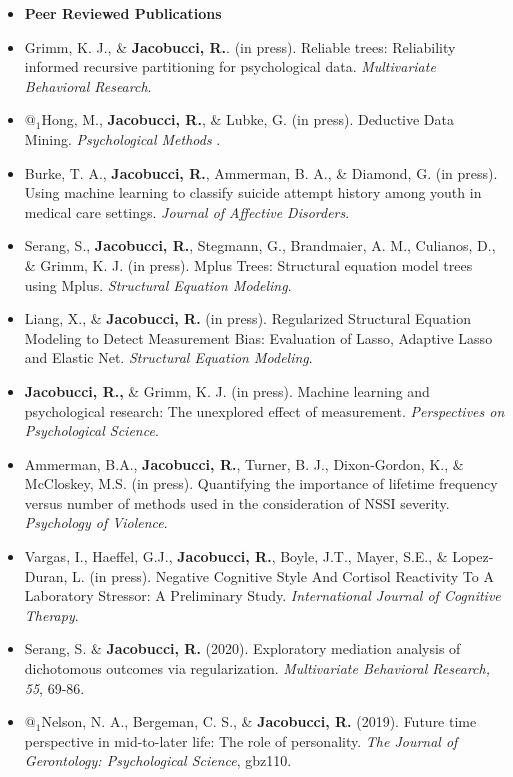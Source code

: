 \documentclass[letterpaper,10pt]{article}
\begin{document}
\begin{itemize} 
\setlength{\topsep}{0pt}%
\setlength{\leftmargin}{0.1in}%
\setlength{\listparindent}{-0.1in}%
\setlength{\itemindent}{-0.2in}%
\setlength{\parsep}{\parskip}%

\item {\textbf{\large{Peer Reviewed Publications}}}
% 
\item[] Grimm, K. J., \& \textbf{Jacobucci, R.}. (in press). Reliable trees: Reliability informed recursive partitioning for psychological data. \emph{Multivariate Behavioral Research}.
%
\item[] $@_1$Hong, M., \textbf{Jacobucci, R.}, \& Lubke, G. (in press). Deductive Data Mining. \emph{Psychological Methods }.
%
\item[] Burke, T. A., \textbf{Jacobucci, R.}, Ammerman, B. A., \& Diamond, G. (in press). Using machine learning to classify suicide attempt history among youth in medical care settings. \emph{Journal of Affective Disorders}.
%
\item[] Serang, S., \textbf{Jacobucci, R.}, Stegmann, G., Brandmaier, A. M., Culianos, D., \& Grimm, K. J. (in press). Mplus Trees: Structural equation model trees using Mplus. \emph{Structural Equation Modeling}.
%
\item[] Liang, X., \& \textbf{Jacobucci, R.} (in press). Regularized Structural Equation Modeling to Detect Measurement Bias: Evaluation of Lasso, Adaptive Lasso and Elastic Net. \emph{Structural Equation Modeling}.
%
\item[] \textbf{Jacobucci, R.,} \& Grimm, K. J. (in press). Machine learning and psychological research: The unexplored effect of measurement. \emph{Perspectives on Psychological Science}.
%
\item[] Ammerman, B.A., \textbf{Jacobucci, R.}, Turner, B. J., Dixon-Gordon, K., \& McCloskey, M.S. (in press). Quantifying the importance of lifetime frequency versus number of methods used in the consideration of NSSI severity. \emph{Psychology of Violence}.
% 
\item[] Vargas, I., Haeffel, G.J., \textbf{Jacobucci, R.}, Boyle, J.T., Mayer, S.E., \& Lopez-Duran, L. (in press). Negative Cognitive Style And Cortisol Reactivity To A Laboratory Stressor: A Preliminary Study. \emph{International Journal of Cognitive Therapy}. 
% 
\item[]Serang, S. \& \textbf{Jacobucci, R.} (2020). Exploratory mediation analysis of dichotomous outcomes via regularization. \emph{Multivariate Behavioral Research, 55}, 69-86.
%
\item[] $@_1$Nelson, N. A., Bergeman, C. S., \& \textbf{Jacobucci, R.} (2019). Future time perspective in mid-to-later life: The role of personality. \emph{The Journal of Gerontology: Psychological Science}, gbz110.

\end{itemize}
\end{document}
